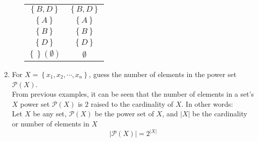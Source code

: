 \documentclass{article}
\begin{document}
\begin{enumerate}[label = \textbf{\alph*)}]
\begin{enumerate}[label = \textbf{\alph*)}]
\begin{tabular}{ | c | c | }
			            $ \left\{ B, D \right\} $                     & $ \left\{ B, D \right\} $    \\
			            $ \left\{ A \right\} $                        & $ \left\{ A \right\} $       \\
			            $ \left\{ B \right\} $                        & $ \left\{ B \right\} $       \\
			            $ \left\{ D \right\} $                        & $ \left\{ D \right\} $       \\
			            $ \left\{ \right\} \left( \emptyset \right) $ & $ \emptyset $
		            \end{tabular}
	      \end{enumerate}
	\item For $ X = \left\{ x_1, x_2, \cdots, x_n \right\} $, guess the number of elements in the power set $ \mathcal{P}(X) $. \\
	      From previous examples, it can be seen that the number of elements in a set's $ X $ power set $ \mathcal{P}(X) $ is $ 2 $ raised to the cardinality of $ X $. In other words: \\
	      Let $ X $ be any set, $ \mathcal{P}(X) $ be the power set of $ X $, and $ | X | $ be the cardinality or number of elements in $ X $
	      \begin{equation*}
		      | \mathcal{P}(X) | = 2^{| X |}
	      \end{equation*}
\end{enumerate}
\end{document}
